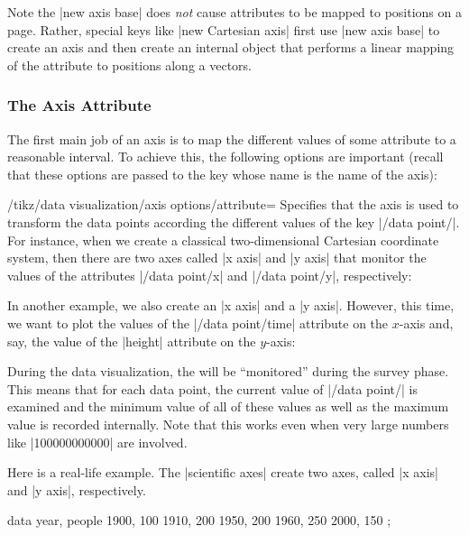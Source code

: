 Note the |new axis base| does \emph{not} cause attributes to be mapped to
positions on a page. Rather, special keys like |new Cartesian axis| first use
|new axis base| to create an axis and then create an internal object that
performs a linear mapping of the attribute to positions along a vectors.


\subsubsection{The Axis Attribute}
\label{section-dv-axis-attribute}

The first main job of an axis is to map the different values of some attribute
to a reasonable interval. To achieve this, the following options are important
(recall that these options are passed to the key whose name is the name of the
axis):

\begin{key}{/tikz/data visualization/axis options/attribute=}
    Specifies that the axis is used to transform the data points according the
    different values of the key |/data point/|. For instance,
    when we create a classical two-dimensional Cartesian coordinate system,
    then there are two axes called |x axis| and |y axis| that monitor the
    values of the attributes |/data point/x| and |/data point/y|, respectively:
\begin{codeexample}
\end{codeexample}
    In another example, we also create an |x axis| and a |y axis|. However,
    this time, we want to plot the values of the |/data point/time| attribute
    on the $x$-axis and, say, the value of the |height| attribute on the
    $y$-axis:
\begin{codeexample}
\end{codeexample}
    During the data visualization, the  will be ``monitored''
    during the survey phase. This means that for each data point, the current
    value of |/data point/| is examined and the minimum value
    of all of these values as well as the maximum value is recorded internally.
    Note that this works even when very large numbers like |100000000000| are
    involved.

    Here is a real-life example. The |scientific axes| create two axes, called
    |x axis| and |y axis|, respectively.
\begin{codeexample}[]
\tikz \datavisualization [scientific axes,
                          x axis={attribute=people, length=2.5cm, ticks=few},
                          y axis={attribute=year},
                          visualize as scatter]
  data {
    year, people
    1900, 100
    1910, 200
    1950, 200
    1960, 250
    2000, 150
  };
\end{codeexample}
\end{key}


